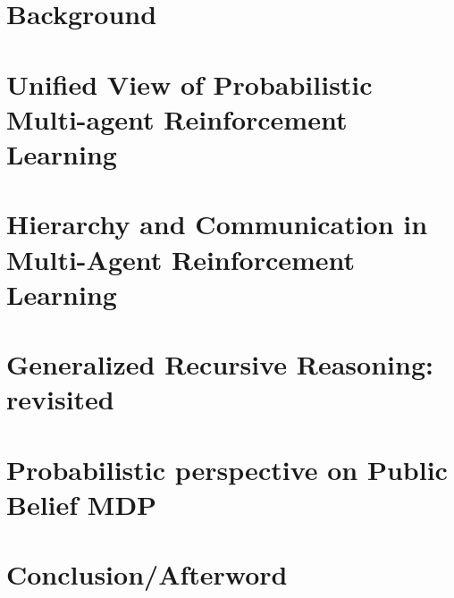 \documentclass{report}
\begin{document}
\chapter{Background}


\chapter{Unified View of Probabilistic Multi-agent Reinforcement Learning}


% 

% 

\chapter{Hierarchy and Communication in Multi-Agent Reinforcement Learning}


% 

\chapter{Generalized Recursive Reasoning: revisited}


\chapter{Probabilistic perspective on Public Belief MDP}


\chapter{Conclusion/Afterword}


\appendix
\end{document}

